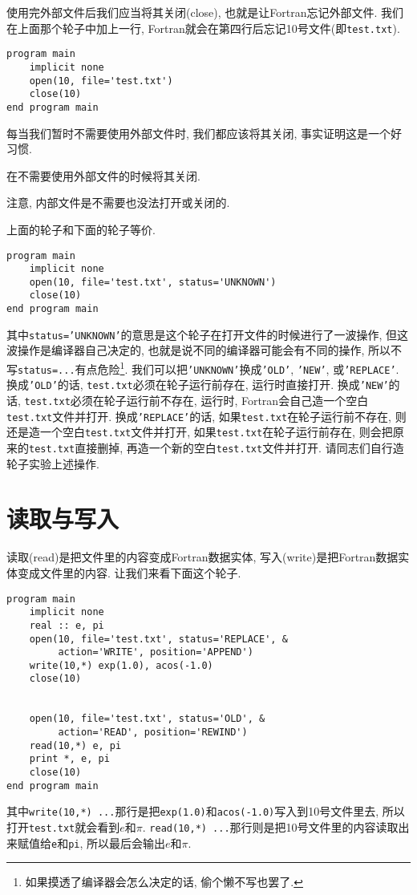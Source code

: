 使用完外部文件后我们应当将其关闭(close), 也就是让Fortran忘记外部文件. 我们在上面那个轮子中加上一行, Fortran就会在第四行后忘记10号文件(即\texttt{test.txt}).
\begin{lstlisting}
program main
    implicit none
    open(10, file='test.txt')
    close(10)
end program main
\end{lstlisting}

每当我们暂时不需要使用外部文件时, 我们都应该将其关闭, 事实证明这是一个好习惯.

\begin{convention}
    在不需要使用外部文件的时候将其关闭.
\end{convention}

注意, 内部文件是不需要也没法打开或关闭的.

上面的轮子和下面的轮子等价.
\begin{lstlisting}
program main
    implicit none
    open(10, file='test.txt', status='UNKNOWN')
    close(10)
end program main
\end{lstlisting}
其中\texttt{status='UNKNOWN'}的意思是这个轮子在打开文件的时候进行了一波操作, 但这波操作是编译器自己决定的, 也就是说不同的编译器可能会有不同的操作, 所以不写\texttt{status=...}有点危险\footnote{如果摸透了编译器会怎么决定的话, 偷个懒不写也罢了.\label{no_add}}. 我们可以把\texttt{'UNKNOWN'}换成\texttt{'OLD'}, \texttt{'NEW'}, 或\texttt{'REPLACE'}. 换成\texttt{'OLD'}的话, \texttt{test.txt}必须在轮子运行前存在, 运行时直接打开. 换成\texttt{'NEW'}的话, \texttt{test.txt}必须在轮子运行前不存在, 运行时, Fortran会自己造一个空白\texttt{test.txt}文件并打开. 换成\texttt{'REPLACE'}的话, 如果\texttt{test.txt}在轮子运行前不存在, 则还是造一个空白\texttt{test.txt}文件并打开, 如果\texttt{test.txt}在轮子运行前存在, 则会把原来的\texttt{test.txt}直接删掉, 再造一个新的空白\texttt{test.txt}文件并打开. 请同志们自行造轮子实验上述操作.

\section{读取与写入}

读取(read)是把文件里的内容变成Fortran数据实体, 写入(write)是把Fortran数据实体变成文件里的内容. 让我们来看下面这个轮子.
\begin{lstlisting}
program main
    implicit none
    real :: e, pi
    open(10, file='test.txt', status='REPLACE', &
         action='WRITE', position='APPEND')
    write(10,*) exp(1.0), acos(-1.0)
    close(10)


    open(10, file='test.txt', status='OLD', &
         action='READ', position='REWIND')
    read(10,*) e, pi
    print *, e, pi
    close(10)
end program main
\end{lstlisting}
其中\texttt{write(10,*) ...}那行是把\texttt{exp(1.0)}和\texttt{acos(-1.0)}写入到10号文件里去, 所以打开\texttt{test.txt}就会看到$e$和$\pi$. \texttt{read(10,*) ...}那行则是把10号文件里的内容读取出来赋值给\texttt{e}和\texttt{pi}, 所以最后会输出$e$和$\pi$.

